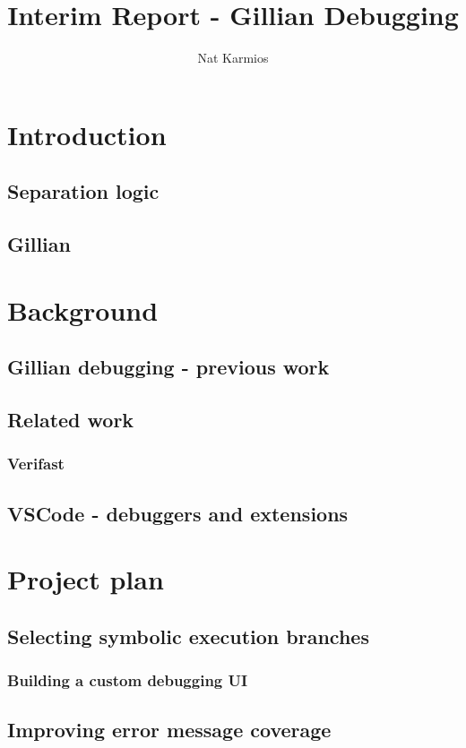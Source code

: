 \documentclass[a4paper, twoside]{report}
\title{Interim Report - Gillian Debugging}
\author{Nat Karmios}
\begin{document}
\tableofcontents

\chapter{Introduction}
\section{Separation logic}
\section{Gillian}

\chapter{Background}
\section{Gillian debugging - previous work}

\section{Related work}
\subsection{Verifast}

\section{VSCode - debuggers and extensions}

\chapter{Project plan}
\section{Selecting symbolic execution branches}
\subsection{Building a custom debugging UI}

\section{Improving error message coverage}
\end{document}
